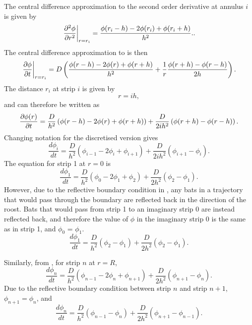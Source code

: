 The central difference approximation to the second order derivative at annulus $i$ is given by
%
\begin{equation}
 \left.\frac{\partial^2 \phi}{\partial r^2}\right|_{r=r_i}= \frac{\phi(r_i-h)-2\phi(r_i)+\phi(r_i+h)}{h^2}. .\label{eqn:diffusion_discretei}
\end{equation}
%
The central difference approximation to  is then
%
\begin{equation}
 \left.\frac{\partial \phi}{\partial t}\right|_{r=r_i} = D \left(\frac{\phi(r-h)-2\phi(r)+\phi(r+h)}{h^2} + \frac{1}{r} \frac{\phi(r+h)-\phi(r-h)}{2 h} \right).
 \label{eqn:diffusion_polar_cd}
\end{equation}
%
The distance $r_i$ at strip $i$ is given by
\begin{equation}
r = i h ,
\end{equation}
%
and  can therefore be written as
%
\begin{equation}
\frac{\partial \phi(r)}{\partial t} = \frac{D}{h^2} \left(\phi(r-h)-2\phi(r)+\phi(r+h)\right) + \frac{D}{2ih^2}\left(\phi(r+h)-\phi(r-h) \right).
\label{eqn:diffusion_polar_final}
\end{equation}
%
Changing notation for the discretised version gives
%
\begin{equation}
\frac{d\phi_i}{dt} = \frac{D}{h^2}(\phi_{i-1}-2\phi_i +\phi_{i+1}) + \frac{D}{2ih^2} (\phi_{i+1}-\phi_{i}).
        \label{eqn:discrete_diffusion_i}
\end{equation}
%
The equation for strip 1 at $r=0$ is
%
\begin{equation}
\frac{d\phi_1}{dt} = \frac{D}{h^2}(\phi_{0}-2\phi_1 +\phi_{2}) + \frac{D}{2h^2} (\phi_{2}-\phi_{1}).
\end{equation}
%
However, due to the reflective boundary condition in , any bats in a trajectory that would pass through the boundary are reflected back in the direction of the roost. Bats that would pass from strip 1 to an imaginary strip 0 are instead reflected back, and therefore the value of $\phi$ in the imaginary strip 0 is the same as in strip 1, and $\phi_0$ = $\phi_1$.
%
\begin{equation}
\frac{d\phi_1}{dt} = \frac{D}{h^2}(\phi_{2}- \phi_1) + \frac{D}{2h^2} (\phi_{2}-\phi_{1}) .
        \label{eqn:strip_1}
\end{equation}

Similarly, from , for strip $n$ at $r=R$,
%
\begin{equation}
\frac{d\phi_n}{dt} = \frac{D}{h^2}(\phi_{n-1}-2\phi_n +\phi_{n+1}) + \frac{D}{2h^2} (\phi_{n+1}-\phi_{n}) .
\end{equation}
%
Due to the reflective boundary condition between strip $n$ and strip $n+1$, $\phi_{n+1} = \phi_n$, and
\begin{equation}
\frac{d\phi_n}{dt} = \frac{D}{h^2}(\phi_{n-1}-\phi_n) + \frac{D}{2h^2} (\phi_{n+1}-\phi_{n-1}) .
        \label{eqn:strip_n}
\end{equation}

